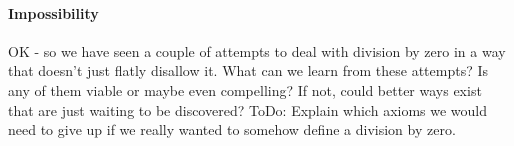\paragraph{Impossibility} OK - so we have seen a couple of attempts to deal with division by zero in a way that doesn't just flatly disallow it. What can we learn from these attempts? Is any of them viable or maybe even compelling? If not, could better ways exist that are just waiting to be discovered? ToDo: Explain which axioms we would need to give up if we really wanted to somehow define a division by zero.




